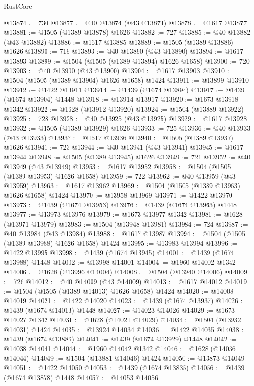 \begin{lexlean}{RustCore}
\begin{coremodule}
@13874 := 730
@13877 := @40 @13874 (@43 @13874)
@13878 := @1617 @13877
@13881 := @1505 (@1389 @13878) @1626
@13882 := 727
@13885 := @40 @13882 (@43 @13882)
@13886 := @1617 @13885
@13889 := @1505 (@1389 @13886) @1626
@13890 := 719
@13893 := @40 @13890 (@43 @13890)
@13894 := @1617 @13893
@13899 := @1504 (@1505 (@1389 @13894) @1626 @1658)
@13900 := 720
@13903 := @40 @13900 (@43 @13900)
@13904 := @1617 @13903
@13910 := @1504 (@1505 (@1389 @13904) @1626 @1658) @1424
@13911 := @13899 @13910
@13912 := @1422 @13911
@13914 := @1439 (@1674 @13894)
@13917 := @1439 (@1674 @13904) @1448
@13918 := @13914 @13917
@13920 := @1673 @13918 @1342
@13922 := @1628 (@13912 @13920)
@13924 := @1504 (@13889 @13922)
@13925 := 728
@13928 := @40 @13925 (@43 @13925)
@13929 := @1617 @13928
@13932 := @1505 (@1389 @13929) @1626
@13933 := 725
@13936 := @40 @13933 (@43 @13933)
@13937 := @1617 @13936
@13940 := @1505 (@1389 @13937) @1626
@13941 := 723
@13944 := @40 @13941 (@43 @13941)
@13945 := @1617 @13944
@13948 := @1505 (@1389 @13945) @1626
@13949 := 721
@13952 := @40 @13949 (@43 @13949)
@13953 := @1617 @13952
@13958 := @1504 (@1505 (@1389 @13953) @1626 @1658)
@13959 := 722
@13962 := @40 @13959 (@43 @13959)
@13963 := @1617 @13962
@13969 := @1504 (@1505 (@1389 @13963) @1626 @1658) @1424
@13970 := @13958 @13969
@13971 := @1422 @13970
@13973 := @1439 (@1674 @13953)
@13976 := @1439 (@1674 @13963) @1448
@13977 := @13973 @13976
@13979 := @1673 @13977 @1342
@13981 := @1628 (@13971 @13979)
@13983 := @1504 (@13948 @13981)
@13984 := 724
@13987 := @40 @13984 (@43 @13984)
@13988 := @1617 @13987
@13994 := @1504 (@1505 (@1389 @13988) @1626 @1658) @1424
@13995 := @13983 @13994
@13996 := @1422 @13995
@13998 := @1439 (@1674 @13945)
@14001 := @1439 (@1674 @13988) @1448
@14002 := @13998 @14001
@14004 := @1960 @14002 @1342
@14006 := @1628 (@13996 @14004)
@14008 := @1504 (@13940 @14006)
@14009 := 726
@14012 := @40 @14009 (@43 @14009)
@14013 := @1617 @14012
@14019 := @1504 (@1505 (@1389 @14013) @1626 @1658) @1424
@14020 := @14008 @14019
@14021 := @1422 @14020
@14023 := @1439 (@1674 @13937)
@14026 := @1439 (@1674 @14013) @1448
@14027 := @14023 @14026
@14029 := @1673 @14027 @1342
@14031 := @1628 (@14021 @14029)
@14034 := @1504 (@13932 @14031) @1424
@14035 := @13924 @14034
@14036 := @1422 @14035
@14038 := @1439 (@1674 @13886)
@14041 := @1439 (@1674 @13929) @1448
@14042 := @14038 @14041
@14044 := @1960 @14042 @1342
@14046 := @1628 (@14036 @14044)
@14049 := @1504 (@13881 @14046) @1424
@14050 := @13873 @14049
@14051 := @1422 @14050
@14053 := @1439 (@1674 @13835)
@14056 := @1439 (@1674 @13878) @1448
@14057 := @14053 @14056

\end{coremodule}
\end{lexlean}
